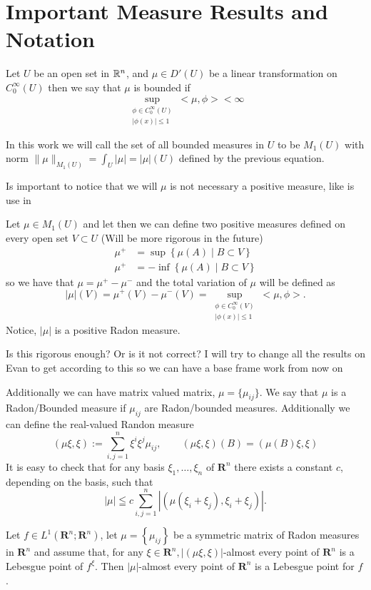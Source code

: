 \section{Important Measure Results and Notation}

\begin{definition} Let $U$ be an open set in $\mathbb{R}^n$, and $\mu\in D'(U)$ be a linear transformation on $C^\infty_0(U)$ then we say that $\mu$ is  bounded if
$$
\sup_{\substack{\phi \in {C}_0^{\infty}(U) \\ |\phi(x)| \leq 1}} <\mu, \phi> < \infty$$

In this work we will call the set of all bounded measures in $U$ to be $M_1(U)$ with norm $\|\mu\|_{M_1(U)}=\int_U|\mu|=|\mu|(U)$ defined by the previous equation.
\end{definition}
\begin{remark}
Is important to notice that we will $\mu$ is not necessary a positive measure, like is use in \cite{evansGa}
\end{remark}

\begin{definition}
Let $\mu\in M_1(U)$  and let then we can define two positive measures defined on every open set $V\subset U$ (Will be more rigorous in the future)
\begin{align*}
   \mu^+&=\sup\left\{\mu(A)\mid B\subset V \right\}\\
   \mu^+&=-\inf\left\{\mu(A)\mid B\subset V \right\}
\end{align*}
so we have that $\mu=\mu^+-\mu^-$ and the total variation of $\mu$ will be defined as
$$|\mu|(V)=\mu^+(V)-\mu^-(V)=\sup_{\substack{\phi \in {C}_0^{\infty}(V) \\ |\phi(x)| \leq 1}} <\mu, \phi>.$$
Notice, $|\mu|$ is a positive Radon measure.
\end{definition}


\begin{question}
Is this rigorous enough? Or is it not correct? I will try to change all the results on Evan to get according to this so we can have a base frame work from now on
\end{question}

Additionally we can have matrix valued matrix, $\mu= \{\mu_{ij}\}$. We say that $\mu$ is a Radon/Bounded measure if $\mu_{ij}$ are Radon/bounded measures.  Additionally we can define the real-valued Randon measure
$$
(\mu \xi, \xi):=\sum_{i, j=1}^n \xi^i \xi^j \mu_{i j}, \qquad (\mu \xi, \xi)(B)= (\mu(B) \xi, \xi)
$$
It is easy to check that for any basis $\xi_1, \ldots, \xi_n$ of $\mathbf{R}^n$ there exists a constant $c$, depending on the basis, such that
$$
|\mu| \leqq c \sum_{i, j=1}^n\left|\left(\mu\left(\xi_i+\xi_j\right), \xi_i+\xi_j\right)\right|.
$$
\begin{lemma}
Let $f \in L^1\left(\mathbf{R}^n ; \mathbf{R}^n\right)$, let $\mu=\left\{\mu_{i j}\right\}$ be a symmetric matrix of Radon measures in $\mathbf{R}^n$ and assume that, for any $\xi \in \mathbf{R}^n,|(\mu \xi, \xi)|$-almost every point of $\mathbf{R}^n$ is a Lebesgue point of $f^{\xi}$. Then $|\mu|$-almost every point of $\mathbf{R}^n$ is a Lebesgue point for $f$.
\end{lemma}

